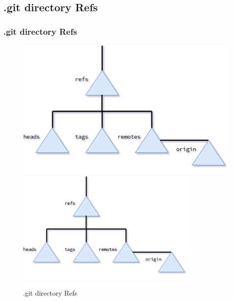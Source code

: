 \subsection*{.git directory Refs}
\begin{frame}[fragile]
    \frametitle{.git directory Refs}
    \begin{figure}
        \begin{center}
            {
                \includegraphics[height=0.75\textheight,keepaspectratio]{./images/gitDirectory-Refs.png}
            }
            {
                \includegraphics[height=0.75\textheight,width=0.8\textwidth]{./images/gitDirectory-Refs.png}
            }
            \caption{.git directory Refs}
        \end{center}
    \end{figure}
\end{frame}

